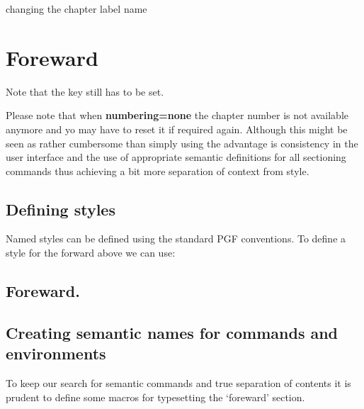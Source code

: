 \begin{decription}
{\begin{texexample}{changing the chapter label name}{}
\chapter{Foreward}
\lorem
\end{texexample}

Note that the key  still has to be set.


Please note that when \textbf{numbering=none} the chapter number is not available anymore and yo may have to reset it if required again. Although this might be seen as rather cumbersome than simply using  the advantage is consistency in the user interface and the use of appropriate semantic definitions for all sectioning commands thus achieving a bit more separation of context from style.



\section{Defining styles}

Named styles can be defined using the standard \textsc{PGF} conventions. To define a style for the forward above we can use:

\begin{texexample}{}{}
\chapter{Foreward.}
\lorem
\end{texexample}



\section{Creating semantic names for commands and environments}

To keep our search for semantic commands and true separation of contents it is prudent to define some macros for typesetting the  `foreward' section.

}
\end{decription}
